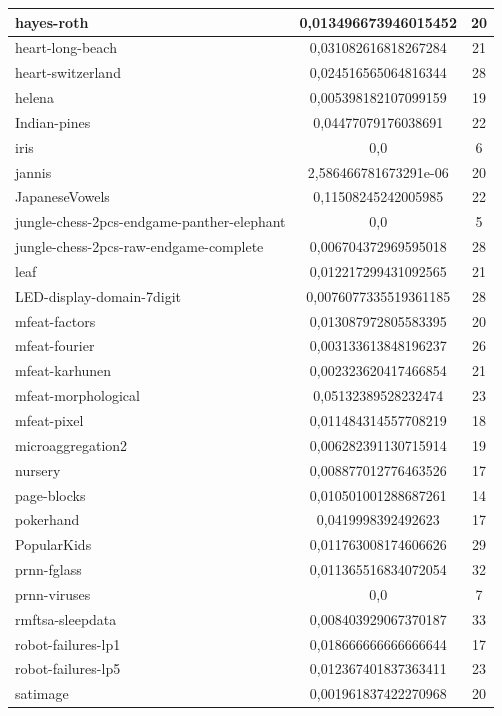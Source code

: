 \documentclass[times,specification,annotation]{itmo-student-thesis}
\begin{document}
\begin{center}
\begin{longtable}{ |m{5cm}|c|c| }
		\hline
		hayes-roth & 0,013496673946015452 & 20 \\
		\hline
		heart-long-beach & 0,031082616818267284 & 21 \\
		\hline
		heart-switzerland & 0,024516565064816344 & 28 \\
		\hline
		helena & 0,005398182107099159 & 19 \\
		\hline
		Indian-pines & 0,04477079176038691 & 22 \\
		\hline
		iris & 0,0 & 6 \\
		\hline
		jannis & 2,586466781673291e-06 & 20 \\
		\hline
		JapaneseVowels & 0,11508245242005985 & 22 \\
		\hline
		jungle-chess-2pcs-endgame-panther-elephant & 0,0 & 5 \\
		\hline
		jungle-chess-2pcs-raw-endgame-complete & 0,006704372969595018 & 28 \\
		\hline
		leaf & 0,012217299431092565 & 21 \\
		\hline
		LED-display-domain-7digit & 0,0076077335519361185 & 28 \\
		\hline
		mfeat-factors & 0,013087972805583395 & 20 \\
		\hline
		mfeat-fourier & 0,003133613848196237 & 26 \\
		\hline
		mfeat-karhunen & 0,002323620417466854 & 21 \\
		\hline
		mfeat-morphological & 0,05132389528232474 & 23 \\
		\hline
		mfeat-pixel & 0,011484314557708219 & 18 \\
		\hline
		microaggregation2 & 0,006282391130715914 & 19 \\
		\hline
		nursery & 0,008877012776463526 & 17 \\
		\hline
		page-blocks & 0,010501001288687261 & 14 \\
		\hline
		pokerhand & 0,0419998392492623 & 17 \\
		\hline
		PopularKids & 0,011763008174606626 & 29 \\
		\hline
		prnn-fglass & 0,011365516834072054 & 32 \\
		\hline
		prnn-viruses & 0,0 & 7 \\
		\hline
		rmftsa-sleepdata & 0,008403929067370187 & 33 \\
		\hline
		robot-failures-lp1 & 0,018666666666666644 & 17 \\
		\hline
		robot-failures-lp5 & 0,012367401837363411 & 23 \\
		\hline
		satimage & 0,001961837422270968 & 20 \\

\end{longtable}
\end{center}
\end{document}
